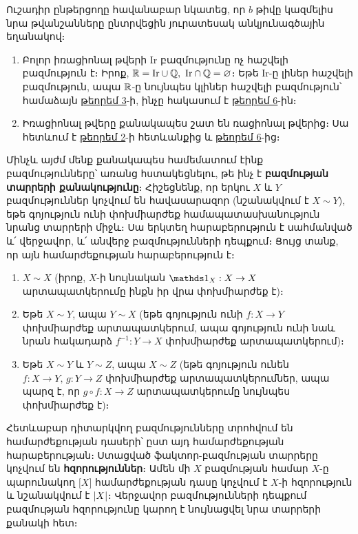 \documentclass[./main.tex]{subfiles}
\begin{document}
\begin{note} 
Ուշադիր ընթերցողը հավանաբար նկատեց, որ $b$ թիվը կազմե\-լիս նրա թվանշանները ընտրվեցին յուրատեսակ անկյունագծային եղանակով։
\end{note}

\begin{hetevanq6}\label{ch3cor3}
\begin{enumerate}
    \item[ա)] Բոլոր իռացիոնալ թվերի $\textrm{Ir}$ բազմությունը ոչ հաշվելի բազմություն է։ Իրոք, $\mathbb{R}= \textrm{Ir} \cup \mathbb{Q},\ \textrm{Ir} \cap \mathbb{Q}=\varnothing$։ Եթե $\textrm{Ir}$-ը լիներ հաշվելի բազմություն, ապա $\mathbb{R}$-ը նույնպես կլիներ հաշվելի բազմություն՝ համաձայն \hyperref[ch3thm3]{թեորեմ 3}-ի, ինչը հակասում է \hyperref[ch3thm6]{թեորեմ 6}-ին։
    \item[բ)] Իռացիոնալ թվերը քանակապես շատ են ռացիոնալ թվերից։ Սա հետևում է \hyperref[ch3thm2]{թեորեմ 2}-ի հետևանքից և \hyperref[ch3thm6]{թեորեմ 6}-ից։
\end{enumerate}
\end{hetevanq6}
Մինչև այժմ մենք քանակապես համեմատում էինք բազմությունները՝ առանց հստակեցնելու, թե ինչ է \textbf{բազմության տարրերի քանակությունը}։ Հիշեցնենք, որ երկու $X$ և $Y$ բազմություններ կոչվում են հավասարազոր (նշանակվում է ${X\sim Y}$), եթե գոյություն ունի փոխմիարժեք համապատասխանություն նրանց տարրերի միջև։ Սա երկտեղ հարաբերություն է սահմանված և՛ վերջավոր, և՛ անվերջ բազմու\-թյուն\-ների դեպքում։ Ցույց տանք, որ այն համարժեքության հարաբերություն է։
\begin{enumerate}
    \item $X\sim X$ (իրոք, $X$-ի նույնական $\nuynakan_X: X \rightarrow X$ արտապատկերումը ինքն իր վրա փոխմիարժեք է)։
    \item Եթե $X\sim Y$, ապա $Y\sim X$ (եթե գոյություն ունի ${f:X\rightarrow Y}$ փոխմիարժեք արտապատկերում, ապա գոյություն ունի նաև նրան հակադարձ ${f^{-1}:Y\rightarrow X}$ փոխմիարժեք արտապատկերում)։
    \item Եթե $X\sim Y$ և $Y\sim Z$, ապա $X\sim Z$ (եթե գոյություն ունեն ${f:X\rightarrow Y},\, {g:Y\rightarrow Z}$ փոխմիարժեք արտապատկերումներ, ապա պարզ է, որ ${g\circ f:X\rightarrow Z}$ արտա\-պատ\-կե\-րումը նույնպես փոխմիարժեք է)։
\end{enumerate}
\par Հետևաբար դիտարկվող բազմությունները տրոհվում են համարժեքության դա\-սե\-րի՝ ըստ այդ համարժեքության հարաբերության։ Ստացված ֆակտոր-բազ\-մու\-թյան տար\-րերը կոչվում են \textbf{հզորություններ}։ Ամեն մի $X$ բազմության համար $X$-ը պարու\-նակող $\big[X\big]$ համարժեքության դասը կոչվում է $X$-ի հզորություն և նշանակ\-վում է $\lvert X\rvert$։ Վերջավոր բազմությունների դեպքում բազմության հզորությունը կարող է նույնացվել նրա տարրերի քանակի հետ։
\end{document}
